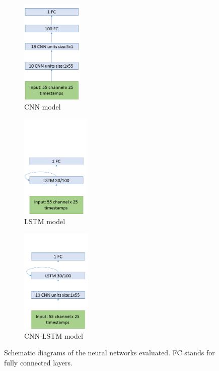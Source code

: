 \documentclass[
12pt, %
english, %
doublespacing, %
headsepline, %
]{MastersDoctoralThesis} %
\begin{document}
	\begin{figure}[t]
		\centering
		\begin{minipage}{.3\textwidth}
			\centering
			\begin{subfigure}{1.0\textwidth}
				\centering
				\includegraphics[height=5cm]{P300_CNN_arch}
				\caption{CNN model}
				\label{fig:CNN_model}
			\end{subfigure}
		\end{minipage}	
		\begin{minipage}{.3\textwidth}
			
			\centering
			\begin{subfigure}{1.0\textwidth}
				\centering
				\includegraphics[height=5cm]{P300_LSTM_arch_v3}
				\caption{LSTM model}
				\label{fig:LSTM_model}
			\end{subfigure}
			
		\end{minipage}%
		\begin{minipage}{.3\textwidth}
			\centering
			\begin{subfigure}{1.0\textwidth}
			\centering
			\includegraphics[height=5cm]{P300_LSTM_CNN_arch_v3}		
			\caption{CNN-LSTM model}
			\label{fig:LSTM_model_CNN}		
			\end{subfigure}
		\end{minipage}
		
		\caption{Schematic diagrams of the neural networks evaluated. FC stands for fully connected layers.}
	\end{figure}
								
\end{document}
